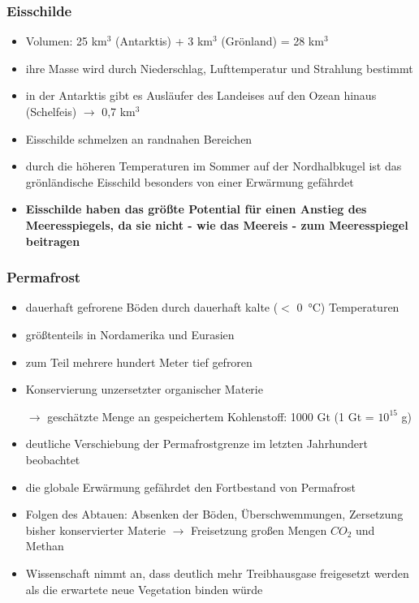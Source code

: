\begin{frame}
	\frametitle{Eisschilde}
	\begin{itemize}
		\item Volumen: 25 km$^3$ (Antarktis) + 3 km$^3$ (Grönland) = 28 km$^3$
		\item ihre Masse wird durch Niederschlag, Lufttemperatur und Strahlung bestimmt %
		\item in der Antarktis gibt es Ausläufer des Landeises auf den Ozean hinaus (Schelfeis) $\rightarrow$ 0,7 km$^3$
		\item Eisschilde schmelzen an randnahen Bereichen
		\item durch die höheren Temperaturen im Sommer auf der Nordhalbkugel ist das grönländische Eisschild besonders von einer Erwärmung gefährdet
		\item \textbf{Eisschilde haben das größte Potential für einen Anstieg des Meeresspiegels, da sie nicht - wie das Meereis - zum Meeresspiegel beitragen}
	\end{itemize}
\end{frame}

\begin{frame}
	\frametitle{Permafrost}
	\begin{itemize}
		\item dauerhaft gefrorene Böden durch dauerhaft kalte ($<$ \SI{0}{\degreeCelsius}) Temperaturen
		\item größtenteils in Nordamerika und Eurasien
		\item zum Teil mehrere hundert Meter tief gefroren %
		\item Konservierung unzersetzter organischer Materie
		\item [$\rightarrow$] geschätzte Menge an gespeichertem Kohlenstoff: 1000 Gt (1 Gt = $10^15$ g)
		\item deutliche Verschiebung der Permafrostgrenze im letzten Jahrhundert beobachtet %
		\item die globale Erwärmung gefährdet den Fortbestand von Permafrost 
		\item Folgen des Abtauen: Absenken der Böden, Überschwemmungen, Zersetzung bisher konservierter Materie $\rightarrow$ Freisetzung großen Mengen $CO_2$ und Methan
		\item Wissenschaft nimmt an, dass deutlich mehr Treibhausgase freigesetzt werden als die erwartete neue Vegetation binden würde
	\end{itemize}
\end{frame}

